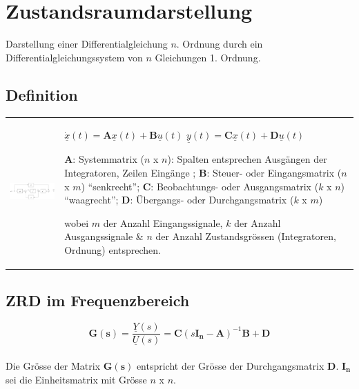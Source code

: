 \section{Zustandsraumdarstellung}
\scriptsize
Darstellung einer Differentialgleichung $n$. Ordnung durch ein
Differentialgleichungssystem von $n$ Gleichungen 1. Ordnung.

\subsection{Definition}
\begin{tabular}{ll}
\parbox{10cm}{
	\includegraphics[width=10cm]{./bilder/zrd-schema.png}
	}
	& \parbox{8cm}{
		$\dot{\underline{x}}(t) = {\boldsymbol A} \underline{x}(t) + {\boldsymbol B}
		\underline{u}(t)$ \\
		$\underline{y}(t) = {\boldsymbol C} \underline{x}(t) + {\boldsymbol D}
		\underline{u}(t)$\\ 
		
		${\boldsymbol A}$: Systemmatrix ($n$ x $n$): Spalten entsprechen Ausgängen
		der Integratoren, Zeilen Eingänge ; \\ 
		${\boldsymbol B}$: Steuer- oder
		Eingangsmatrix ($n$ x $m$) ``senkrecht''; \\ ${\boldsymbol C}$: Beobachtungs- oder Ausgangsmatrix ($k$ x $n$)
		``waagrecht''; \\
		${\boldsymbol D}$: Übergangs- oder Durchgangsmatrix ($k$ x
		$m$)\\
		
		wobei $m$ der Anzahl Eingangssignale, $k$ der Anzahl Ausgangssignale \& $n$ der
		Anzahl Zustandsgrössen (Integratoren, Ordnung) entsprechen.\\
	}
 \end{tabular}


\subsection{ZRD im Frequenzbereich }
$$\boldsymbol{G(s)} = \frac{\underline{Y}(s)}{\underline{U}(s)} =
\boldsymbol{C}\left(s\boldsymbol{I_n}-\boldsymbol{A}\right)^{-1}\boldsymbol{B}+\boldsymbol{D}$$
\\
Die Grösse der Matrix $\boldsymbol {G(s)}$ entspricht der Grösse der
Durchgangsmatrix $\boldsymbol D$. $\boldsymbol{I_n}$ sei die Einheitsmatrix mit
Grösse $n$ x $n$.

